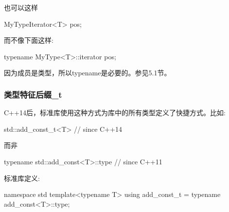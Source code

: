 也可以这样

\begin{cpp}
MyTypeIterator<T> pos;
\end{cpp}

而不像下面这样:

\begin{cpp}
typename MyType<T>::iterator pos;
\end{cpp}

\begin{notice}
因为成员是类型，所以typename是必要的。参见5.1节。
\end{notice}

\subsubsection{类型特征后缀\_t}

C++14后，标准库使用这种方式为库中的所有类型定义了快捷方式。比如:

\begin{cpp}
std::add_const_t<T> // since C++14
\end{cpp}

而非

\begin{cpp}
typename std::add_const<T>::type // since C++11
\end{cpp}

标准库定义:

\begin{cpp}
namespace std {
	template<typename T> using add_const_t = typename add_const<T>::type;
}
\end{cpp}




